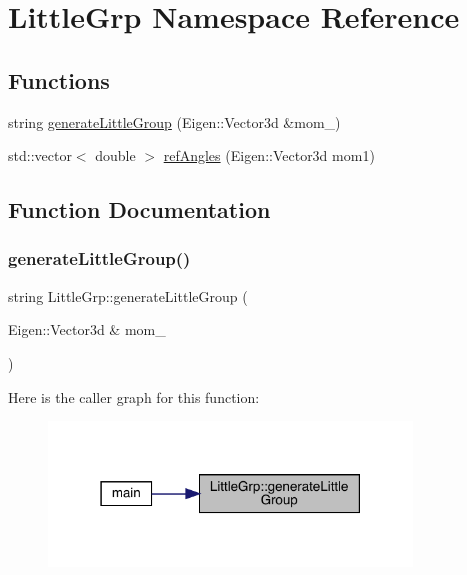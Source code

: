 \hypertarget{namespaceLittleGrp}{}\section{Little\+Grp Namespace Reference}
\label{namespaceLittleGrp}
\subsection*{Functions}
\begin{DoxyCompactItemize}
\item 
string \mbox{\hyperlink{namespaceLittleGrp_a12887808e1a825e9d2c387c5475bcf88}{generate\+Little\+Group}} (Eigen\+::\+Vector3d \&mom\+\_\+)
\item 
std\+::vector$<$ double $>$ \mbox{\hyperlink{namespaceLittleGrp_a93937e135b6b9c963ae9ad26516e252d}{ref\+Angles}} (Eigen\+::\+Vector3d mom1)
\end{DoxyCompactItemize}


\subsection{Function Documentation}
\mbox{\label{namespaceLittleGrp_a12887808e1a825e9d2c387c5475bcf88}} 
\subsubsection{\texorpdfstring{generateLittleGroup()}{generateLittleGroup()}}
{\footnotesize\ttfamily string Little\+Grp\+::generate\+Little\+Group (\begin{DoxyParamCaption}\item[{Eigen\+::\+Vector3d \&}]{mom\+\_\+ }\end{DoxyParamCaption})}

Here is the caller graph for this function\+:\nopagebreak
\begin{figure}[H]
\begin{center}
\leavevmode
\includegraphics[width=274pt]{d1/d4c/namespaceLittleGrp_a12887808e1a825e9d2c387c5475bcf88_icgraph}
\end{center}
\end{figure}
\mbox{\label{namespaceLittleGrp_a93937e135b6b9c963ae9ad26516e252d}} 
